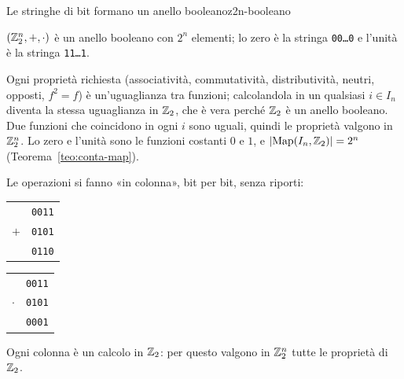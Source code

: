 \begin{concetto}
\begin{Proposizione}{Le stringhe di bit formano un anello booleano}{z2n-booleano}
    \begin{prerequisiti}
    \end{prerequisiti}
    $(\mathbb{Z}_2^n, +, \cdot)$ è un anello booleano con $2^n$ elementi; lo zero è la stringa \texttt{00\dots0} e l'unità è la stringa \texttt{11\dots1}.
\end{Proposizione}
\begin{dimostrazione}
    Ogni proprietà richiesta (associatività, commutatività, distributività, neutri, opposti, $f^2 = f$) è un'uguaglianza tra funzioni; calcolandola in un
    qualsiasi $i \in I_n$ diventa la stessa uguaglianza in $\mathbb{Z}_2$, che è vera perché $\mathbb{Z}_2$ è un anello booleano. Due funzioni che coincidono in ogni $i$ sono uguali,
    quindi le proprietà valgono in $\mathbb{Z}_2^n$. Lo zero e l'unità sono le funzioni costanti $0$ e $1$, e $|\mathrm{Map}(I_n, \mathbb{Z}_2)| = 2^n$ (Teorema~\ref{teo:conta-map}).
\end{dimostrazione}
\end{concetto}

\begin{spiegazione}
    Le operazioni si fanno «in colonna», bit per bit, senza riporti:
    \begin{center}
    \renewcommand{\arraystretch}{1.1}
    \begin{tabular}{r@{\ \ }l}
        & \texttt{0011} \\
        $+$ & \texttt{0101} \\ \hline
        & \texttt{0110} \\
    \end{tabular}
    \qquad\qquad\qquad
    \begin{tabular}{r@{\ \ }l}
        & \texttt{0011} \\
        $\cdot$ & \texttt{0101} \\ \hline
        & \texttt{0001} \\
    \end{tabular}
    \end{center}
    Ogni colonna è un calcolo in $\mathbb{Z}_2$: per questo valgono in $\mathbb{Z}_2^n$ tutte le proprietà di $\mathbb{Z}_2$.
\end{spiegazione}

